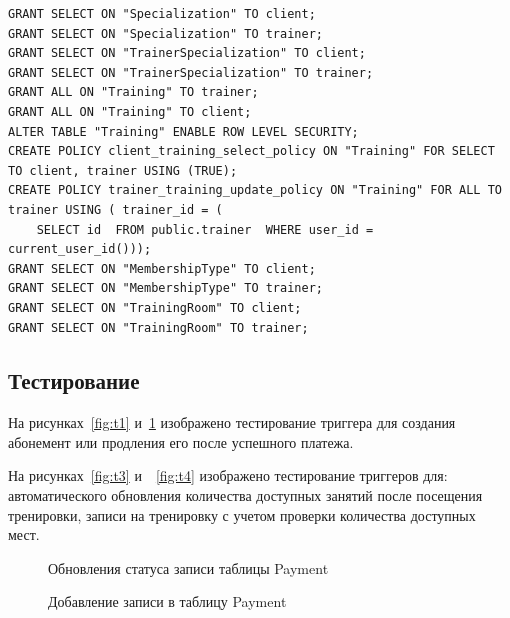 \begin{lstlisting}[label=alg:32, caption=Реализация ролей Client (клиент) и Trainer (тренер), captionpos=t]
GRANT SELECT ON "Specialization" TO client;
GRANT SELECT ON "Specialization" TO trainer;
GRANT SELECT ON "TrainerSpecialization" TO client;
GRANT SELECT ON "TrainerSpecialization" TO trainer;
GRANT ALL ON "Training" TO trainer;
GRANT ALL ON "Training" TO client;
ALTER TABLE "Training" ENABLE ROW LEVEL SECURITY;
CREATE POLICY client_training_select_policy ON "Training" FOR SELECT TO client, trainer USING (TRUE);
CREATE POLICY trainer_training_update_policy ON "Training" FOR ALL TO trainer USING ( trainer_id = (
	SELECT id  FROM public.trainer  WHERE user_id = current_user_id()));
GRANT SELECT ON "MembershipType" TO client;
GRANT SELECT ON "MembershipType" TO trainer;
GRANT SELECT ON "TrainingRoom" TO client;
GRANT SELECT ON "TrainingRoom" TO trainer;
\end{lstlisting}

\subsection{Тестирование}

На рисунках~\ref{fig:t1} и~\ref{fig:t2} изображено тестирование триггера для создания абонемент или продления его после успешного платежа.

На рисунках~\ref{fig:t3} и~~\ref{fig:t4} изображено тестирование триггеров для: автоматического обновления количества доступных занятий после посещения тренировки, записи на тренировку с учетом проверки количества доступных мест.

\newpage
\begin{figure}[ht!]
	\begin{center}
		\begin{minipage}[b]{0.5\linewidth}
			\centering
			\caption{Обновления статуса записи таблицы Payment}
			\label{fig:t1}
		\end{minipage}%
		\begin{minipage}[b]{0.5\linewidth}
			\centering
			\caption{Добавление записи в таблицу Payment}
			\label{fig:t2}
		\end{minipage}
	\end{center}
\end{figure}

